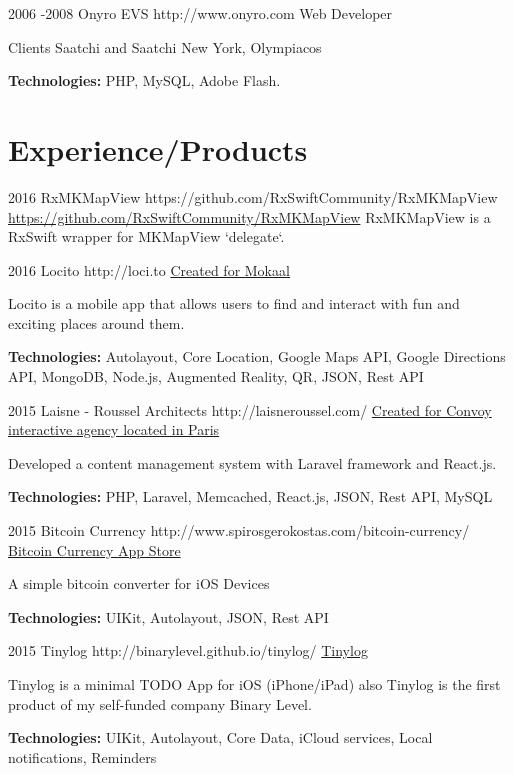 \documentclass[10pt]{article}
\begin{document}

\job
{2006 -}{2008}
{Onyro EVS}
{http://www.onyro.com}
{Web Developer}
{Clients Saatchi and Saatchi New York, Olympiacos
\\
\rule{0mm}{5mm}\textbf{Technologies:} PHP, MySQL, Adobe Flash.}


\section{Experience/Products}

\job
{2016}{}
{RxMKMapView}
{https://github.com/RxSwiftCommunity/RxMKMapView}
{\href{https://github.com/RxSwiftCommunity/RxMKMapView/}{https://github.com/RxSwiftCommunity/RxMKMapView}}
{RxMKMapView is a RxSwift wrapper for MKMapView `delegate`.}

\job
{2016}{}
{Locito}
{http://loci.to}
{\href{http://www.mokaal.com/index.html}{Created for Mokaal}}
{Locito is a mobile app that allows users to find and interact with fun and exciting places around them.
\\
\rule{0mm}{5mm}\textbf{Technologies:} Autolayout, Core Location, Google Maps API, Google Directions API, MongoDB, Node.js, Augmented Reality, QR, JSON, Rest API}

\job
{2015}{}
{Laisne - Roussel Architects}
{http://laisneroussel.com/}
{\href{http://www.convoy.me}{Created for Convoy interactive agency located in Paris}}
{Developed a content management system with Laravel framework and React.js.
\\
\rule{0mm}{5mm}\textbf{Technologies:} PHP, Laravel, Memcached, React.js, JSON, Rest API, MySQL}

\job
{2015}{}
{Bitcoin Currency}
{http://www.spirosgerokostas.com/bitcoin-currency/}
{\href{https://itunes.apple.com/us/app/bitcoin-currency/id946708232?ls=1&mt=8}{Bitcoin Currency App Store}}
{A simple bitcoin converter for iOS Devices
\\
\rule{0mm}{5mm}\textbf{Technologies:} UIKit, Autolayout, JSON, Rest API}

\job
{2015}{}
{Tinylog}
{http://binarylevel.github.io/tinylog/}
{\href{https://github.com/binarylevel/Tinylog-iOS}{Tinylog}}
{Tinylog is a minimal TODO App for iOS (iPhone/iPad) also Tinylog is the first product of my self-funded company Binary Level.
\\
\rule{0mm}{5mm}\textbf{Technologies:} UIKit, Autolayout, Core Data, iCloud services, Local notifications, Reminders}
\end{document}
